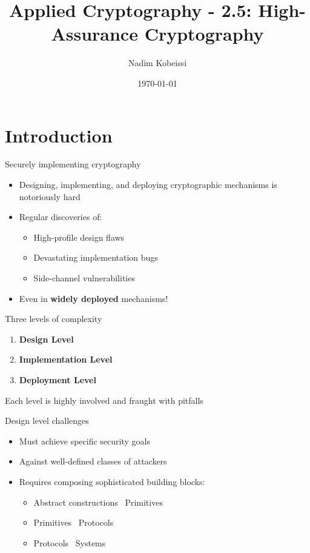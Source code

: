 \documentclass[aspectratio=169, lualatex, handout]{beamer}
\title{Applied Cryptography - 2.5: High-Assurance Cryptography}
\author{Nadim Kobeissi}
\institute{American University of Beirut}
\date{\today}
\begin{document}
\begin{frame}[plain]
	\titlepage
\end{frame}

\section{Introduction}

\begin{frame}{Securely implementing cryptography}
	\begin{itemize}
		\item Designing, implementing, and deploying cryptographic mechanisms is notoriously hard
		\item Regular discoveries of:
		      \begin{itemize}
			      \item High-profile design flaws
			      \item Devastating implementation bugs
			      \item Side-channel vulnerabilities
		      \end{itemize}
		\item Even in \textbf{widely deployed} mechanisms!
	\end{itemize}
\end{frame}

\begin{frame}{Three levels of complexity}
	\begin{center}
		\Large
		\begin{enumerate}
			\item \textbf{Design Level}
			\item \textbf{Implementation Level}
			\item \textbf{Deployment Level}
		\end{enumerate}
		\vspace{1em}
		\normalsize
		Each level is highly involved and fraught with pitfalls
	\end{center}
\end{frame}

\begin{frame}{Design level challenges}
	\begin{itemize}
		\item Must achieve specific security goals
		\item Against well-defined classes of attackers
		\item Requires composing sophisticated building blocks:
		      \begin{itemize}
			      \item Abstract constructions \rightarrow\ Primitives
			      \item Primitives \rightarrow\ Protocols
			      \item Protocols \rightarrow\ Systems
		      \end{itemize}
	\end{itemize}
\end{frame}
\end{document}
